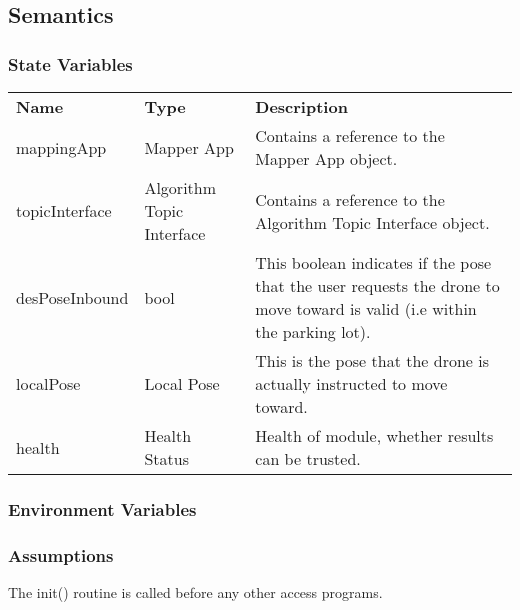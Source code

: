 \documentclass[12pt, titlepage]{article}
\begin{document}
\subsection{Semantics}
\subsubsection{State Variables}
\begin{center}
\begin{tabular}{p{3 cm} p{3cm} p{7cm} }
\hline
\textbf{Name} & \textbf{Type} & \textbf{Description}  \\
mappingApp & Mapper App & Contains a reference to the Mapper App object. \\
topicInterface & Algorithm Topic Interface & Contains a reference to the Algorithm Topic Interface object.\\
desPoseInbound & bool & This boolean indicates if the pose that the user requests the drone to move toward is valid (i.e within the parking lot).  \\ 
localPose & Local Pose & This is the pose that the drone is actually instructed to move toward. \\
health & Health Status & Health of module, whether results can be trusted.   \\
\hline
\hline
\end{tabular}
\end{center}
\subsubsection{Environment Variables}
\subsubsection{Assumptions}
The init() routine is called before any other access programs.
\end{document}
